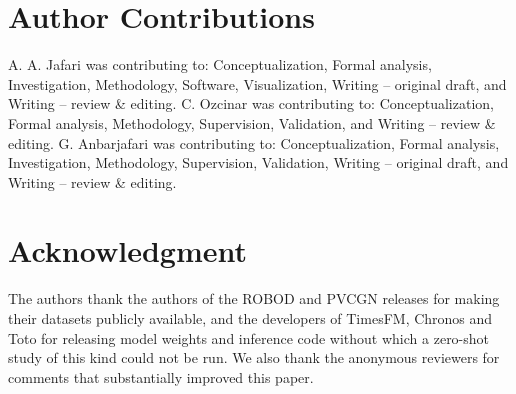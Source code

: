 \documentclass[utf8]{FrontiersinHarvard}
\newif\ifrevisionmarkup
\newcommand{\new}[1]{\ifrevisionmarkup\textcolor{revision}{#1}\else#1\fi}
\newif\ifsecondrevisionmarkup
\newcommand{\rev}[1]{\ifsecondrevisionmarkup\textcolor{revisiontwo}{#1}\else#1\fi}
\theoremstyle{plain}
\theoremstyle{definition}
\theoremstyle{remark}
\begin{document}
\section*{Author Contributions}

A. A. Jafari was contributing to: Conceptualization, Formal analysis, Investigation, Methodology, Software, Visualization, Writing -- original draft, and Writing -- review \& editing. C. Ozcinar was contributing to: Conceptualization, Formal analysis, Methodology, Supervision, Validation, and Writing -- review \& editing. G. Anbarjafari was contributing to: Conceptualization, Formal analysis, Investigation, Methodology, Supervision, Validation, Writing -- original draft, and Writing -- review \& editing.

\section*{Acknowledgment}
\new{The authors thank the authors of the ROBOD and PVCGN releases for making their datasets publicly available, and the developers of TimesFM, Chronos and Toto for releasing model weights and inference code without which a zero-shot study of this kind could not be run. \rev{We also thank the anonymous reviewers for comments that substantially improved this paper.}}

 

\end{document}

